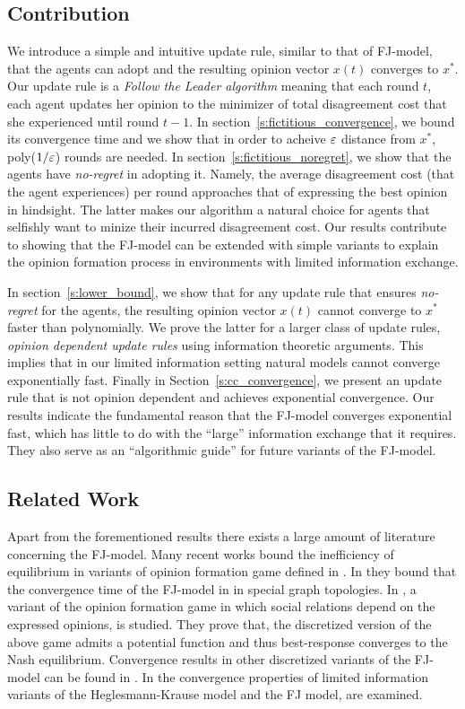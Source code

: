 \subsection{Contribution}
We introduce a simple and intuitive update rule,
similar to that of FJ-model, that the agents can adopt
and the resulting opinion vector $x(t)$ converges to $x^*$.
Our update rule is a \emph{Follow the Leader algorithm}
meaning that each round $t$, each agent updates her opinion
to the minimizer of total disagreement cost that
she experienced until round $t-1$. In section~\ref{s:fictitious_convergence},
we bound its convergence time and we show that in order
to acheive $\varepsilon$ distance from $x^*$, poly($1/\varepsilon$) rounds 
are needed. In section~\ref{s:fictitious_noregret},
we show that the agents have \emph{no-regret} in adopting
it. Namely, the average disagreement cost (that
the agent experiences) per round approaches that
of expressing the best opinion in hindsight. The latter
makes our algorithm a natural choice for agents that 
selfishly want to minize their incurred disagreement cost.
Our results contribute to showing that the FJ-model 
can be extended with simple variants to explain
the opinion formation process in environments with limited
information exchange. 

In section~\ref{s:lower_bound}, we show 
that for any update rule that ensures \emph{no-regret}
for the agents, the resulting opinion vector $x(t)$
cannot converge to $x^*$ faster than polynomially. We
prove the latter for a larger class of update rules,
\emph{opinion dependent update rules} using information
theoretic arguments. This implies that in our limited 
information setting natural models cannot converge exponentially
fast. Finally in Section~\ref{s:cc_convergence}, we present 
an update rule that is not opinion dependent and achieves exponential
convergence. Our results indicate the fundamental reason that
the FJ-model converges exponential fast, which has little 
to do with the \enquote{large} information exchange that it requires.
They also serve as an \enquote{algorithmic guide} for future 
variants of the FJ-model. 

\subsection{Related Work}
Apart from the forementioned results there exists a large amount 
of literature concerning the FJ-model.
Many recent works \cite{BGM13,CKO13,BFM16,EFHS17} bound the 
inefficiency of equilibrium in variants of opinion formation game 
defined in \cite{BKO11}. In \cite{GS14} they bound that the convergence 
time of the FJ-model in in special graph topologies.
In \cite{BFM16}, a variant of the opinion formation game in which social
relations depend on the expressed opinions, is studied.
They prove that, the discretized version of the above game admits
a potential function and thus best-response converges to the
Nash equilibrium. Convergence results in other discretized variants of
the FJ-model can be found in \cite{YOASS13,FGV16}. In \cite{FPS16} the convergence
properties of limited information variants of the Heglesmann-Krause model \cite{HK} 
and the FJ model, are examined.


